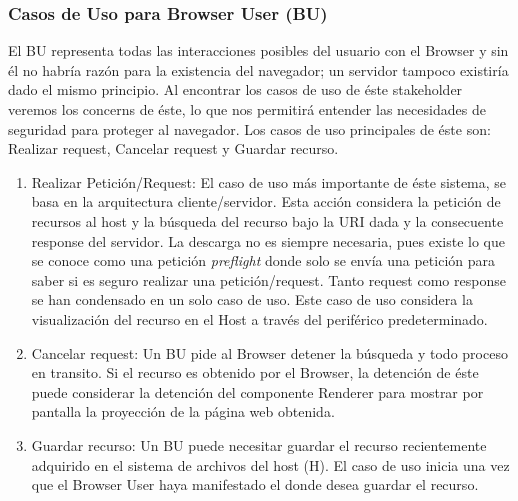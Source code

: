 \subsubsection{Casos de Uso para Browser User (BU)}
		El BU representa todas las interacciones posibles del usuario con el Browser y sin él no habría razón para la existencia del navegador; un servidor tampoco existiría dado el mismo principio. Al encontrar los casos de uso de éste stakeholder veremos los concerns de éste, lo que nos permitirá entender las necesidades de seguridad para proteger al navegador. Los casos de uso principales de éste son: Realizar request, Cancelar request y Guardar recurso.
			\begin{enumerate}	
				\item Realizar Petición/Request: El caso de uso más importante de éste sistema, se basa en la arquitectura cliente/servidor. Esta acción considera la petición de recursos al host y la búsqueda del recurso bajo la URI dada y la consecuente response del servidor. La descarga no es siempre necesaria, pues existe lo que se conoce como una petición \textit{preflight} donde solo se envía una petición para saber si es seguro realizar una petición/request. Tanto request como response se han condensado en un solo caso de uso. Este caso de uso considera la visualización del recurso en el Host a través del periférico predeterminado.
				\item Cancelar request: Un BU pide al Browser detener la búsqueda y todo proceso en transito. Si el recurso es obtenido por el Browser, la detención de éste puede considerar la detención del componente Renderer para mostrar por pantalla la proyección de la página web obtenida.			
				\item Guardar recurso: Un BU puede necesitar guardar el recurso recientemente adquirido en el sistema de archivos del host (H). El caso de uso inicia una vez que el Browser User haya manifestado el donde desea guardar el recurso.
			\end{enumerate}

